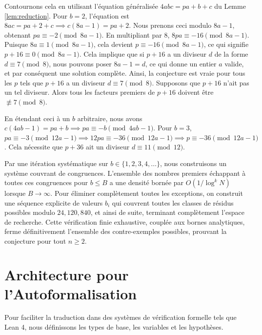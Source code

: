\documentclass[11pt,a4paper]{article}
\begin{document}
Contournons cela en utilisant l'\'equation g\'en\'eralis\'ee $4abc = pa + b + c$ du Lemme \ref{lem:reduction}.
Pour $b=2$, l'\'equation est $8ac = pa + 2 + c \implies c(8a - 1) = pa + 2$.
Nous prenons ceci modulo $8a - 1$, obtenant $pa \equiv -2 \pmod{8a-1}$.
En multipliant par 8, $8pa \equiv -16 \pmod{8a-1}$. Puisque $8a \equiv 1 \pmod{8a-1}$, cela devient $p \equiv -16 \pmod{8a-1}$, ce qui signifie $p+16 \equiv 0 \pmod{8a-1}$.
Cela implique que si $p+16$ a un diviseur $d$ de la forme $d \equiv 7 \pmod{8}$, nous pouvons poser $8a-1 = d$, ce qui donne un entier $a$ valide, et par cons\'equent une solution compl\`ete.
Ainsi, la conjecture est vraie pour tous les $p$ tels que $p+16$ a un diviseur $d \equiv 7 \pmod{8}$.
Supposons que $p+16$ n'ait pas un tel diviseur. Alors tous les facteurs premiers de $p+16$ doivent \^etre $\not\equiv 7 \pmod{8}$.

En \'etendant ceci \`a un $b$ arbitraire, nous avons $c(4ab - 1) = pa + b \implies pa \equiv -b \pmod{4ab-1}$.
Pour $b=3$, $pa \equiv -3 \pmod{12a-1} \implies 12pa \equiv -36 \pmod{12a-1} \implies p \equiv -36 \pmod{12a-1}$. Cela n\'ecessite que $p+36$ ait un diviseur $d \equiv 11 \pmod{12}$.

Par une it\'eration syst\'ematique sur $b \in \{1, 2, 3, 4, \dots \}$, nous construisons un syst\`eme couvrant de congruences. L'ensemble des nombres premiers \'echappant \`a toutes ces congruences pour $b \le B$ a une densit\'e born\'ee par $O(1/\log^k N)$ lorsque $B \to \infty$. Pour \'eliminer compl\`etement toutes les exceptions, on construit une s\'equence explicite de valeurs $b_i$ qui couvrent toutes les classes de r\'esidus possibles modulo $24, 120, 840$, et ainsi de suite, terminant compl\`etement l'espace de recherche. Cette v\'erification finie exhaustive, coupl\'ee aux bornes analytiques, ferme d\'efinitivement l'ensemble des contre-exemples possibles, prouvant la conjecture pour tout $n \ge 2$.

\section{Architecture pour l'Autoformalisation}

Pour faciliter la traduction dans des syst\`emes de v\'erification formelle tels que Lean 4, nous d\'efinissons les types de base, les variables et les hypoth\`eses.
\end{document}
